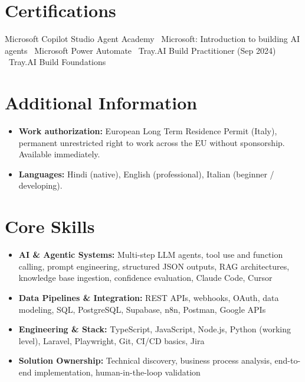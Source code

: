 \documentclass[a4paper,11pt]{article}
\begin{document}
\section{Certifications}
Microsoft Copilot Studio Agent Academy \textbullet\ Microsoft: Introduction to building AI agents \textbullet\ Microsoft Power Automate \textbullet\ Tray.AI Build Practitioner (Sep 2024) \textbullet\ Tray.AI Build Foundations

\section{Additional Information}
\begin{itemize}
 \item \textbf{Work authorization:} European Long Term Residence Permit (Italy), permanent unrestricted right to work across the EU without sponsorship. Available immediately.
 \item \textbf{Languages:} Hindi (native), English (professional), Italian (beginner / developing).
\end{itemize}

\section{Core Skills}
\begin{itemize}
 \item \textbf{AI \& Agentic Systems:} Multi-step LLM agents, tool use and function calling, prompt engineering, structured JSON outputs, RAG architectures, knowledge base ingestion, confidence evaluation, Claude Code, Cursor
 \item \textbf{Data Pipelines \& Integration:} REST APIs, webhooks, OAuth, data modeling, SQL, PostgreSQL, Supabase, n8n, Postman, Google APIs
 \item \textbf{Engineering \& Stack:} TypeScript, JavaScript, Node.js, Python (working level), Laravel, Playwright, Git, CI/CD basics, Jira
 \item \textbf{Solution Ownership:} Technical discovery, business process analysis, end-to-end implementation, human-in-the-loop validation
\end{itemize}
\end{document}
